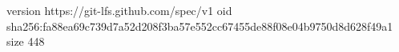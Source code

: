 version https://git-lfs.github.com/spec/v1
oid sha256:fa88ea69c739d7a52d208f3ba57e552cc67455de88f08e04b9750d8d628f49a1
size 448
